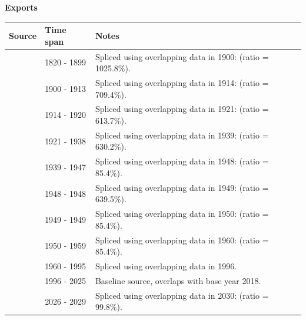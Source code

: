 \documentclass[12pt,a4paper,landscape]{article}
\begin{document}
\begin{adjustbox}{max totalsize={\paperwidth}{\paperheight},center}
\begin{minipage}[t][\textheight][t]{\textwidth}
\vspace*{0.5cm}
{}
\begin{center}
{\Large\bfseries Exports}
\end{center}
\vspace{0.5cm}
\begin{table}[H]
\centering
\small
\begin{tabular}{|l|l|l|}
\hline
\textbf{Source} & \textbf{Time span} & \textbf{Notes} \\
\hline
\rowcolor{white}\cite{Tena}& 1820 - 1899 &Spliced using overlapping data in 1900: (ratio = 1025.8\%). \\
\rowcolor{lightgray}\cite{UN_trade}& 1900 - 1913 &Spliced using overlapping data in 1914: (ratio = 709.4\%). \\
\rowcolor{white}\cite{Tena}& 1914 - 1920 &Spliced using overlapping data in 1921: (ratio = 613.7\%). \\
\rowcolor{lightgray}\cite{UN_trade}& 1921 - 1938 &Spliced using overlapping data in 1939: (ratio = 630.2\%). \\
\rowcolor{white}\cite{Mitchell}& 1939 - 1947 &Spliced using overlapping data in 1948: (ratio = 85.4\%). \\
\rowcolor{lightgray}\cite{UN_trade}& 1948 - 1948 &Spliced using overlapping data in 1949: (ratio = 639.5\%). \\
\rowcolor{white}\cite{Mitchell}& 1949 - 1949 &Spliced using overlapping data in 1950: (ratio = 85.4\%). \\
\rowcolor{lightgray}\cite{UN_trade}& 1950 - 1959 &Spliced using overlapping data in 1960: (ratio = 85.4\%). \\
\rowcolor{white}\cite{WDI}& 1960 - 1995 &Spliced using overlapping data in 1996. \\
\rowcolor{lightgray}\cite{OECD_EO}& 1996 - 2025 &Baseline source, overlaps with base year 2018. \\
\rowcolor{white}\cite{IMF_WEO_forecast}& 2026 - 2029 &Spliced using overlapping data in 2030: (ratio = 99.8\%). \\
\hline
\end{tabular}
\end{table}
\begin{figure}[H]
\centering

\end{figure}
\end{minipage}
\end{adjustbox}
\end{document}
